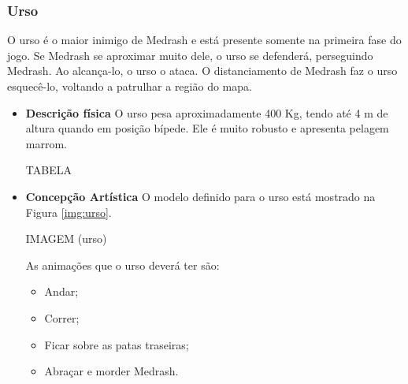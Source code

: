 \subsubsection{Urso}
O urso é o maior inimigo de Medrash e está presente somente na primeira
 fase do jogo. Se Medrash se aproximar muito dele, o urso se defenderá,
 perseguindo Medrash. Ao alcança-lo, o urso o ataca. O distanciamento de
 Medrash faz o urso esquecê-lo, voltando a patrulhar a região do mapa.
\begin{itemize}
\item {\bf Descrição física}
O urso pesa aproximadamente 400 Kg, tendo até 4 m de altura quando em
 posição bípede. Ele é muito robusto e apresenta pelagem marrom.

TABELA

\item {\bf Concepção Artística}
O modelo definido para o urso está mostrado na Figura \ref{img:urso}.

IMAGEM (urso)

As animações que o urso deverá ter são:
\begin{itemize}
\item Andar;
\item Correr;
\item Ficar sobre as patas traseiras;
\item Abraçar e morder Medrash.
\end{itemize}
\end{itemize}

